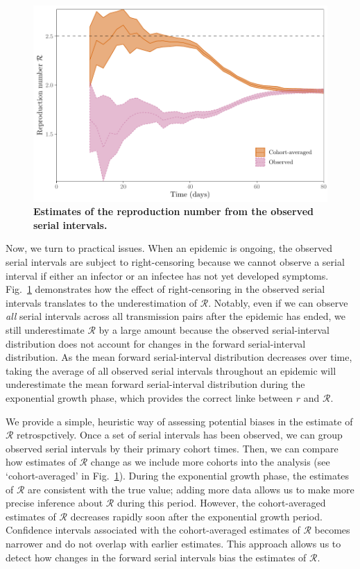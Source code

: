 \documentclass[12pt]{article}
\newcommand{\fref}[1]{Fig.~\ref{fig:#1}}
\begin{document}
\begin{figure}[!th]
\includegraphics[width=\textwidth]{observedrR.pdf}
\caption{
\textbf{Estimates of the reproduction number from the observed serial intervals.}
}
\label{fig:obsrR}
\end{figure}

Now, we turn to practical issues.
When an epidemic is ongoing, the observed serial intervals are subject to right-censoring because we cannot observe a serial interval if either an infector or an infectee has not yet developed symptoms.
\fref{obsrR} demonstrates how the effect of right-censoring in the observed serial intervals translates to the underestimation of $\mathcal R$.
Notably, even if we can observe \emph{all} serial intervals across all transmission pairs after the epidemic has ended, we still underestimate $\mathcal R$ by a large amount because the observed serial-interval distribution does not account for changes in the forward serial-interval distribution.
As the mean forward serial-interval distribution decreases over time, taking the average of all observed serial intervals throughout an epidemic will underestimate the mean forward serial-interval distribution during the exponential growth phase, which provides the correct linke between $r$ and $\mathcal R$.

We provide a simple, heuristic way of assessing potential biases in the estimate of $\mathcal R$ retrospctively.
Once a set of serial intervals has been observed, we can group observed serial intervals by their primary cohort times.
Then, we can compare how estimates of $\mathcal R$ change as we include more cohorts into the analysis (see `cohort-averaged' in \fref{obsrR}).
During the exponential growth phase, the estimates of $\mathcal R$ are consistent with the true value;
adding more data allows us to make more precise inference about $\mathcal R$ during this period.
However, the cohort-averaged estimates of $\mathcal R$ decreases rapidly soon after the exponential growth period.
Confidence intervals associated with the cohort-averaged estimates of $\mathcal R$ becomes narrower and do not overlap with earlier estimates.
This approach allows us to detect how changes in the forward serial intervals bias the estimates of $\mathcal R$.
\end{document}
